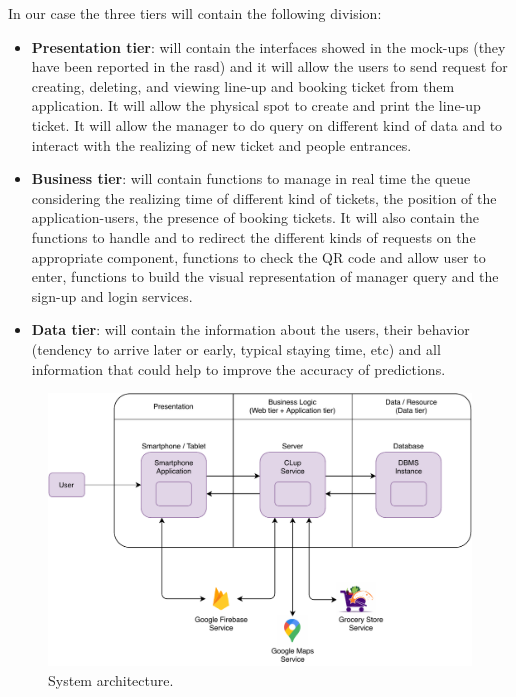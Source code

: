 In our case the three tiers will contain the following division:
\begin{itemize}
    \item \textbf{Presentation tier}: will contain the interfaces showed in the mock-ups (they have been reported in the \gls{rasd}) and it will allow the users to send request for creating, deleting, and viewing line-up and booking ticket from them application. It will allow the physical spot to create and print the line-up ticket. It will allow the manager to do query on different kind of data and to interact with the realizing of new ticket and people entrances.

    \item \textbf{Business tier}: will contain functions to manage in real time the queue considering the realizing time of different kind of tickets, the position of the application-users, the presence of booking tickets. It will also contain the functions to handle and to redirect the different kinds of requests on the appropriate component, functions to check the QR code and allow user to enter, functions to build the visual representation of manager query and the sign-up and login services.

    \item \textbf{Data tier}: will contain the information about the users, their behavior (tendency to arrive later or early, typical staying time, etc) and all information that could help to improve the accuracy of predictions.
\end{itemize}

\begin{figure}[H]
    \centering
    \includegraphics[width=1.0\textwidth]{images/architecture.pdf}
    \caption{System architecture.}
\end{figure}


